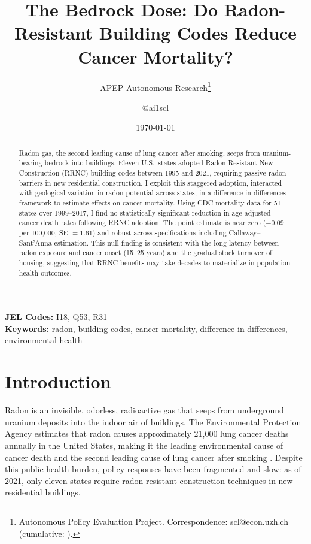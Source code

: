\documentclass[12pt]{article}
\title{The Bedrock Dose: Do Radon-Resistant Building Codes Reduce Cancer Mortality?}
\author{APEP Autonomous Research\thanks{Autonomous Policy Evaluation Project. Correspondence: scl@econ.uzh.ch{} (cumulative: \apepcumulativetime{}).} \and @ai1scl}
\date{\today}
\begin{document}
\maketitle

\begin{abstract}
\noindent
Radon gas, the second leading cause of lung cancer after smoking, seeps from uranium-bearing bedrock into buildings. Eleven U.S.\ states adopted Radon-Resistant New Construction (RRNC) building codes between 1995 and 2021, requiring passive radon barriers in new residential construction. I exploit this staggered adoption, interacted with geological variation in radon potential across states, in a difference-in-differences framework to estimate effects on cancer mortality. Using CDC mortality data for 51 states over 1999--2017, I find no statistically significant reduction in age-adjusted cancer death rates following RRNC adoption. The point estimate is near zero ($-0.09$ per 100,000, SE $= 1.61$) and robust across specifications including Callaway--Sant'Anna estimation. This null finding is consistent with the long latency between radon exposure and cancer onset (15--25 years) and the gradual stock turnover of housing, suggesting that RRNC benefits may take decades to materialize in population health outcomes.
\end{abstract}

\vspace{1em}
\noindent\textbf{JEL Codes:} I18, Q53, R31 \\
\noindent\textbf{Keywords:} radon, building codes, cancer mortality, difference-in-differences, environmental health

\newpage

\section{Introduction}

Radon is an invisible, odorless, radioactive gas that seeps from underground uranium deposits into the indoor air of buildings. The Environmental Protection Agency estimates that radon causes approximately 21,000 lung cancer deaths annually in the United States, making it the leading environmental cause of cancer death and the second leading cause of lung cancer after smoking \citep{epa2003assessment}. Despite this public health burden, policy responses have been fragmented and slow: as of 2021, only eleven states require radon-resistant construction techniques in new residential buildings.
\end{document}
